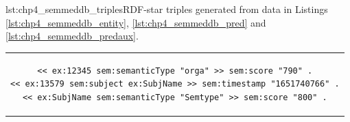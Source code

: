 \begin{minipage}{\linewidth}
\begin{captionedlisting}{lst:chp4_semmeddb_triples}{RDF-star triples generated from data in Listings \ref{lst:chp4_semmeddb_entity}, \ref{lst:chp4_semmeddb_pred} and \ref{lst:chp4_semmeddb_predaux}.}
\centering
\begin{tabular}{c}
{
\begin{lstlisting}[basicstyle=\ttfamily\small,label={list:example1},columns=flexible]
<< ex:12345 sem:semanticType "orga" >> sem:score "790" .
<< ex:13579 sem:subject ex:SubjName >> sem:timestamp "1651740766" .
<< ex:SubjName sem:semanticType "Semtype" >> sem:score "800" .
\end{lstlisting}
}
\end{tabular}
\end{captionedlisting}
\end{minipage}



